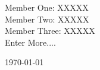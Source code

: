\begin{titlepage}
\begin{center}
    \begingroup %
    \large
    Member One: XXXXX \\
    Member Two: XXXXX \\
    Member Three: XXXXX \\
    Enter More....\\
    \endgroup

    \vspace{1.5cm}
    
    \centering \today %
    \end{center}
    \end{titlepage}

